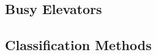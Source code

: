 \begin{center}
%
%




\section{ Busy Elevators }

\subsection{ Classification Methods }


\end{center}
